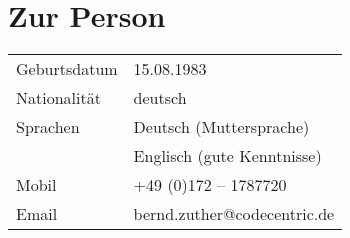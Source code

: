\section*{Zur Person}
\begin{longtable}{@{}p{6cm}p{10cm}}
Geburtsdatum 	& 15.08.1983\\
Nationalität 	& deutsch\\
Sprachen 		& Deutsch (Muttersprache)\\
				& Englisch (gute Kenntnisse)\\
Mobil			& +49 (0)172 – 1787720\\
Email			& bernd.zuther@codecentric.de
\end{longtable}

